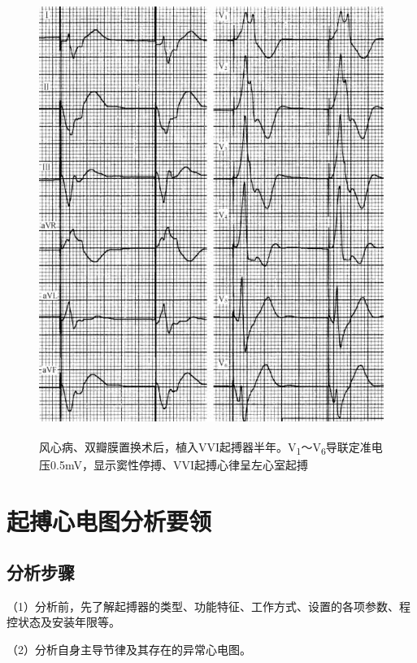 \begin{figure}[!htbp]
 \centering
 \includegraphics[width=4.70833in,height=5.66667in]{./images/Image00645.jpg}
 \captionsetup{justification=centering}
 \caption{风心病、双瓣膜置换术后，植入VVI起搏器半年。V\textsubscript{1}～V\textsubscript{6}导联定准电压0.5mV，显示窦性停搏、VVI起搏心律呈左心室起搏}
 \label{fig38-42}
  \end{figure} 


\protect\hypertarget{text00045.htmlux5cux23subid505}{}{}

\section{起搏心电图分析要领}

\protect\hypertarget{text00045.htmlux5cux23subid506}{}{}

\subsection{分析步骤}

（1）分析前，先了解起搏器的类型、功能特征、工作方式、设置的各项参数、程控状态及安装年限等。

（2）分析自身主导节律及其存在的异常心电图。

